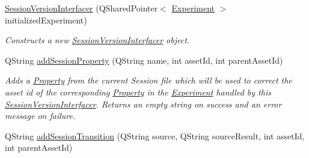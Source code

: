 \begin{DoxyCompactItemize}
\item 
\hyperlink{class_picto_1_1_session_version_interfacer_a1aa560edb0ed8850b8191846a5510d31}{Session\-Version\-Interfacer} (Q\-Shared\-Pointer$<$ \hyperlink{class_picto_1_1_experiment}{Experiment} $>$ initialized\-Experiment)
\begin{DoxyCompactList}\small\item\em Constructs a new \hyperlink{class_picto_1_1_session_version_interfacer}{Session\-Version\-Interfacer} object. \end{DoxyCompactList}\item 
\hypertarget{class_picto_1_1_session_version_interfacer_a85fa3836fd8d081936dfecd74424e220}{Q\-String \hyperlink{class_picto_1_1_session_version_interfacer_a85fa3836fd8d081936dfecd74424e220}{add\-Session\-Property} (Q\-String name, int asset\-Id, int parent\-Asset\-Id)}\label{class_picto_1_1_session_version_interfacer_a85fa3836fd8d081936dfecd74424e220}

\begin{DoxyCompactList}\small\item\em Adds a \hyperlink{class_picto_1_1_property}{Property} from the current Session file which will be used to correct the asset id of the corresponding \hyperlink{class_picto_1_1_property}{Property} in the \hyperlink{class_picto_1_1_experiment}{Experiment} handled by this \hyperlink{class_picto_1_1_session_version_interfacer}{Session\-Version\-Interfacer}. Returns an empty string on success and an error message on failure. \end{DoxyCompactList}\item 
\hypertarget{class_picto_1_1_session_version_interfacer_a65d97b008ff49d9b9451687d8cc178ec}{Q\-String \hyperlink{class_picto_1_1_session_version_interfacer_a65d97b008ff49d9b9451687d8cc178ec}{add\-Session\-Transition} (Q\-String source, Q\-String source\-Result, int asset\-Id, int parent\-Asset\-Id)}\label{class_picto_1_1_session_version_interfacer_a65d97b008ff49d9b9451687d8cc178ec}


\end{DoxyCompactItemize}
